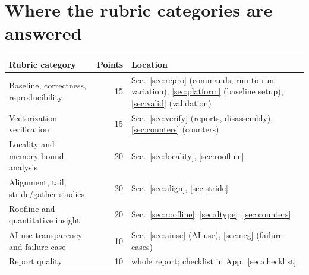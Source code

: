 \documentclass{article}
\begin{document}
\section{Where the rubric categories are answered}\label{sec:rubric}
\begin{center}\small
\begin{tabular}{p{6.0cm}rp{7.6cm}}
\toprule
\textbf{Rubric category} & \textbf{Points} & \textbf{Location} \\
\midrule
Baseline, correctness, reproducibility & 15 & Sec.~\ref{sec:repro} (commands, run-to-run variation), \ref{sec:platform} (baseline setup), \ref{sec:valid} (validation) \\
Vectorization verification & 15 & Sec.~\ref{sec:verify} (reports, disassembly), \ref{sec:counters} (counters) \\
Locality and memory-bound analysis & 20 & Sec.~\ref{sec:locality}, \ref{sec:roofline} \\
Alignment, tail, stride/gather studies & 20 & Sec.~\ref{sec:align}, \ref{sec:stride} \\
Roofline and quantitative insight & 20 & Sec.~\ref{sec:roofline}, \ref{sec:dtype}, \ref{sec:counters} \\
AI use transparency and failure case & 10 & Sec.~\ref{sec:aiuse} (AI use), \ref{sec:neg} (failure cases) \\
Report quality & 10 & whole report; checklist in App.~\ref{sec:checklist} \\
\bottomrule
\end{tabular}
\end{center}
\end{document}
